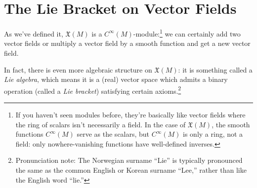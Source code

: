 
\section{The Lie Bracket on Vector Fields}
\label{sec:Lie bracket of vector fields}

As we've defined it, $\mathfrak{X}(M)$ is a $C^\infty(M)$-module:\footnote{If you haven't seen modules before, they're basically like vector fields where the ring of scalars isn't necessarily a field. In the case of $\mathfrak{X}(M)$, the smooth functions $C^\infty(M)$ serve as the scalars, but $C^\infty(M)$ is only a ring, not a field: only nowhere-vanishing functions have well-defined inverses.}  we can certainly add two vector fields or multiply a vector field by a smooth function and get a new vector field.

In fact, there is even more algebraic structure on $\mathfrak{X}(M)$: it is something called a \emph{Lie algebra}, which means it is a (real) vector space which admits a binary operation (called a \emph{Lie bracket}) satisfying certain axioms.\footnote{Pronunciation note: The Norwegian surname ``Lie'' is typically pronounced the same as the common English or Korean surname ``Lee,'' rather than like the English word ``lie.''}

